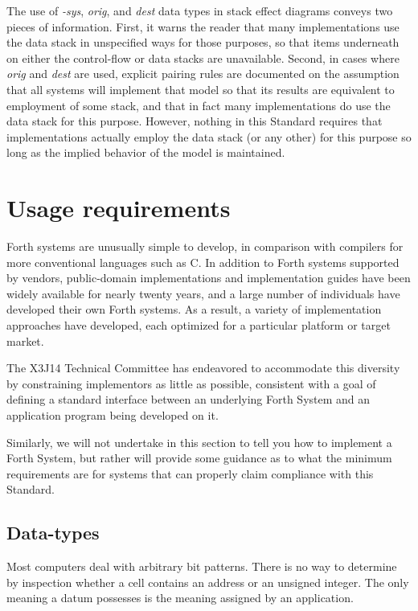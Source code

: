 The use of \emph{-sys}, \emph{orig}, and \emph{dest} data types in
stack effect diagrams conveys two pieces of information. First, it
warns the reader that many implementations use the data stack in
unspecified ways for those purposes, so that items underneath on
either the control-flow or data stacks are unavailable. Second, in
cases where \emph{orig} and \emph{dest} are used, explicit pairing
rules are documented on the assumption that all systems will
implement that model so that its results are equivalent to employment
of some stack, and that in fact many implementations do use the data
stack for this purpose. However, nothing in this Standard requires
that implementations actually employ the data stack (or any other)
for this purpose so long as the implied behavior of the model is
maintained.


\section{Usage requirements} %

Forth systems are unusually simple to develop, in comparison with
compilers for more conventional languages such as C. In addition to
Forth systems supported by vendors, public-domain implementations and
implementation guides have been widely available for nearly twenty
years, and a large number of individuals have developed their own
Forth systems. As a result, a variety of implementation approaches
have developed, each optimized for a particular platform or target
market.

The X3J14 Technical Committee has endeavored to accommodate this
diversity by constraining implementors as little as possible,
consistent with a goal of defining a standard interface between an
underlying Forth System and an application program being developed
on it.

Similarly, we will not undertake in this section to tell you how to
implement a Forth System, but rather will provide some guidance as
to what the minimum requirements are for systems that can properly
claim compliance with this Standard.

\subsection{Data-types} %
\label{rat:types}

Most computers deal with arbitrary bit patterns. There is no way to
determine by inspection whether a cell contains an address or an
unsigned integer. The only meaning a datum possesses is the meaning
assigned by an application.

